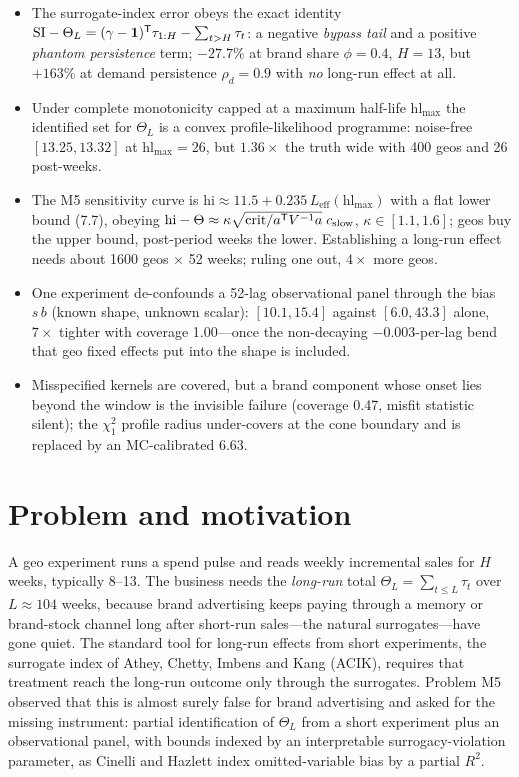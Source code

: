 \begin{keyideas}
\begin{itemize}
\item The surrogate-index error obeys the exact identity $\mathrm{SI} - \Theta_L = (\gamma - \mathbf{1})^{\mathsf{T}}\tau_{1:H} - \sum_{t > H}\tau_t$: a negative \emph{bypass tail} and a positive \emph{phantom persistence} term; $-27.7\%$ at brand share $\phi = 0.4$, $H = 13$, but $+163\%$ at demand persistence $\rho_d = 0.9$ with \emph{no} long-run effect at all.
\item Under complete monotonicity capped at a maximum half-life $\mathrm{hl}_{\max}$ the identified set for $\Theta_L$ is a convex profile-likelihood programme: noise-free $[13.25, 13.32]$ at $\mathrm{hl}_{\max} = 26$, but $1.36\times$ the truth wide with 400 geos and 26 post-weeks.
\item The M5 sensitivity curve is $\mathrm{hi} \approx 11.5 + 0.235\,L_{\mathrm{eff}}(\mathrm{hl}_{\max})$ with a flat lower bound (7.7), obeying $\mathrm{hi} - \Theta \approx \kappa\sqrt{\mathrm{crit}/a^{\mathsf{T}} V^{-1}a}\;c_{\mathrm{slow}}$, $\kappa \in [1.1, 1.6]$; geos buy the upper bound, post-period weeks the lower. Establishing a long-run effect needs about 1600 geos $\times$ 52 weeks; ruling one out, $4\times$ more geos.
\item One experiment de-confounds a 52-lag observational panel through the bias $s\,b$ (known shape, unknown scalar): $[10.1, 15.4]$ against $[6.0, 43.3]$ alone, $7\times$ tighter with coverage 1.00---once the non-decaying $-0.003$-per-lag bend that geo fixed effects put into the shape is included.
\item Misspecified kernels are covered, but a brand component whose onset lies beyond the window is the invisible failure (coverage 0.47, misfit statistic silent); the $\chi^2_1$ profile radius under-covers at the cone boundary and is replaced by an MC-calibrated 6.63.
\end{itemize}
\end{keyideas}

\section{Problem and motivation}

A geo experiment runs a spend pulse and reads weekly incremental sales for $H$ weeks, typically 8--13. The business needs the \emph{long-run} total $\Theta_L = \sum_{t \le L}\tau_t$ over $L \approx 104$ weeks, because brand advertising keeps paying through a memory or brand-stock channel long after short-run sales---the natural surrogates---have gone quiet. The standard tool for long-run effects from short experiments, the surrogate index of Athey, Chetty, Imbens and Kang (ACIK), requires that treatment reach the long-run outcome only through the surrogates. Problem M5 observed that this is almost surely false for brand advertising and asked for the missing instrument: partial identification of $\Theta_L$ from a short experiment plus an observational panel, with bounds indexed by an interpretable surrogacy-violation parameter, as Cinelli and Hazlett index omitted-variable bias by a partial $R^2$.

